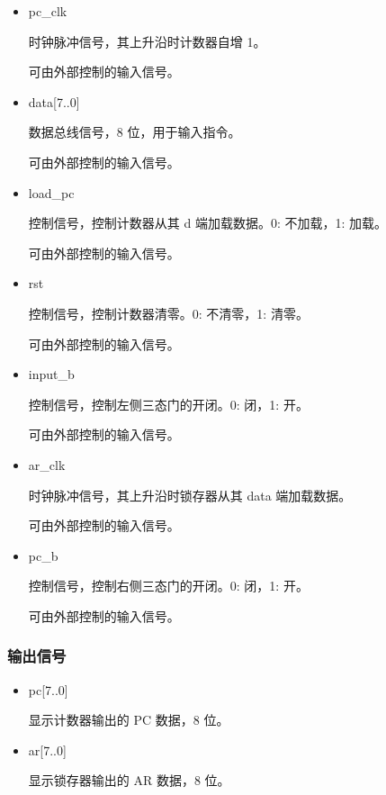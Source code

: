 \begin{itemize}
    \item pc\_clk
    
    时钟脉冲信号，其上升沿时计数器自增 1。

    可由外部控制的输入信号。
    
    \item data[7..0]
    
    数据总线信号，8 位，用于输入指令。
    
    可由外部控制的输入信号。
    
    \item load\_pc
    
    控制信号，控制计数器从其 d 端加载数据。0: 不加载，1: 加载。

    可由外部控制的输入信号。
    
    \item rst
    
    控制信号，控制计数器清零。0: 不清零，1: 清零。
    
    可由外部控制的输入信号。

    \item input\_b
    
    控制信号，控制左侧三态门的开闭。0: 闭，1: 开。
    
    可由外部控制的输入信号。
    
    \item ar\_clk
    
    时钟脉冲信号，其上升沿时锁存器从其 data 端加载数据。

    可由外部控制的输入信号。
    
    \item pc\_b

    控制信号，控制右侧三态门的开闭。0: 闭，1: 开。
        
    可由外部控制的输入信号。
    
\end{itemize} 

\subsubsection{输出信号}

\begin{itemize}
    \item pc[7..0]
    
    显示计数器输出的 PC 数据，8 位。
    
    \item ar[7..0]
    
    显示锁存器输出的 AR 数据，8 位。
    
\end{itemize}

